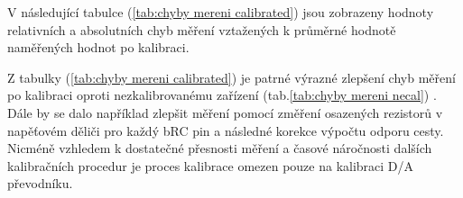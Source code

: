     \clearpage
    V následující tabulce (\ref{tab:chyby mereni calibrated}) jsou zobrazeny hodnoty relativních a absolutních chyb měření
    vztažených k průměrné hodnotě naměřených hodnot po kalibraci.

    \begin{table}[ht!]
        \centering
        \caption{Chyby měření po kalibraci odporů vůči pinu č. 1 nezkalibrované měřící karty}
        \label{tab:chyby mereni calibrated}
        \end{table}

    Z tabulky (\ref{tab:chyby mereni calibrated}) je patrné výrazné zlepšení chyb měření po kalibraci oproti nezkalibrovanému zařízení
    (tab.\ref{tab:chyby mereni necal}) .
    Dále by se dalo například zlepšit měření pomocí změření osazených rezistorů v napěťovém děliči pro každý bRC pin
    a následné korekce výpočtu odporu cesty. Nicméně vzhledem k dostatečné přesnosti
    měření a časové náročnosti dalších kalibračních procedur je proces kalibrace omezen pouze na kalibraci D/A převodníku.\\

